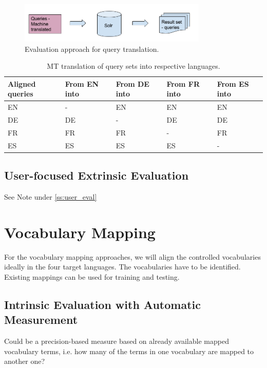 \documentclass[a4paper,11pt]{article}
\begin{document}
\begin{figure}[h]
	\centering
  \includegraphics[width=0.8\textwidth]{./img/queriesMT.png}
	\caption{Evaluation approach for query translation.}
	\label{fig:queriesMT}
\end{figure}


\begin{table}[h]
 \centering\textbf{}
\begin{tabular}[h]{lllll}
    \toprule
    Aligned queries & From EN into & From DE into & From FR into & From ES into \\
    \midrule
	EN  &  -  & \cellcolor{green!25} EN  &  \cellcolor{green!25}EN  & \cellcolor{green!25}EN \\
	DE  & \cellcolor{green!25}DE  & -  & \cellcolor{green!25}DE  & \cellcolor{green!25}DE \\
	FR  & \cellcolor{green!25}FR  & \cellcolor{green!25}FR  & -  & \cellcolor{green!25}FR \\
	ES  & \cellcolor{green!25}ES  & \cellcolor{green!25}ES  & \cellcolor{green!25}ES  & - \\
    \bottomrule
 \end{tabular}
  \caption{MT translation of query sets into respective languages.}
 \label{tab:queries}
\end{table}

\subsection{User-focused Extrinsic Evaluation}
See Note under \ref{ss:user_eval}


\section{Vocabulary Mapping}
For the vocabulary mapping approaches, we will align the controlled vocabularies ideally in the four target languages. The vocabularies have to be identified. Existing mappings can be used for training and testing.

\subsection{Intrinsic Evaluation with Automatic Measurement}
Could be a precision-based measure based on already available mapped vocabulary terms, i.e. how many of the terms in one vocabulary are mapped to another one?
\end{document}
